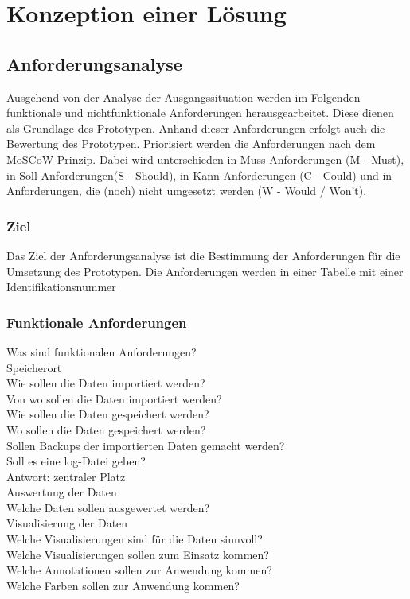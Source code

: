\chapter{Konzeption einer Lösung}
\label{chap:four}

\section{Anforderungsanalyse}
Ausgehend von der Analyse der Ausgangssituation werden im Folgenden funktionale und nichtfunktionale
Anforderungen herausgearbeitet. Diese dienen als Grundlage des Prototypen. Anhand dieser Anforderungen erfolgt 
auch die Bewertung des Prototypen. Priorisiert werden die Anforderungen nach dem MoSCoW-Prinzip. 
Dabei wird unterschieden in Muss-Anforderungen (M - Must), in Soll-Anforderungen(S - Should), in Kann-Anforderungen (C - Could) und in Anforderungen,
die (noch) nicht umgesetzt werden (W - Would / Won't).

\subsection{Ziel}
Das Ziel der Anforderungsanalyse ist die Bestimmung der  Anforderungen für die Umsetzung des Prototypen.
Die Anforderungen werden in einer Tabelle mit einer Identifikationsnummer 


\subsection{Funktionale Anforderungen}
Was sind funktionalen Anforderungen?\\
Speicherort\\
Wie sollen die Daten importiert werden?\\
Von wo sollen die Daten importiert werden?\\
Wie sollen die Daten gespeichert werden?\\
Wo sollen die Daten gespeichert werden?\\
Sollen Backups der importierten Daten gemacht werden?\\
Soll es eine log-Datei geben?\\
Antwort: zentraler Platz\\

Auswertung der Daten\\
Welche Daten sollen ausgewertet werden?\\



Visualisierung der Daten\\
Welche Visualisierungen sind für die Daten sinnvoll?\\
Welche Visualisierungen sollen zum Einsatz kommen?\\
Welche Annotationen sollen zur Anwendung kommen?\\
Welche Farben sollen zur Anwendung kommen?\\



